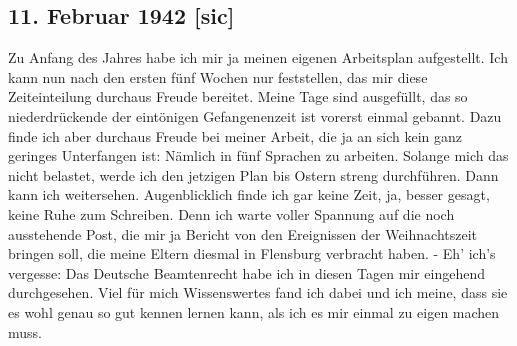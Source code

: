\subsection{11. Februar 1942{\color{red} [sic] }}

Zu Anfang des Jahres habe ich mir ja meinen eigenen Arbeitsplan aufgestellt.
Ich kann nun nach den ersten f\"{u}nf Wochen nur feststellen, das mir diese Zeiteinteilung durchaus Freude bereitet.
Meine Tage sind ausgef\"{u}llt, das so niederdr\"{u}ckende der eint\"{o}nigen Gefangenenzeit ist vorerst einmal gebannt.
Dazu finde ich aber durchaus Freude bei meiner Arbeit, die ja an sich kein ganz geringes Unterfangen ist: N\"{a}mlich in f\"{u}nf Sprachen zu arbeiten.
Solange mich das nicht belastet, werde ich den jetzigen Plan bis Ostern streng durchf\"{u}hren.
Dann kann ich weitersehen.
Augenblicklich finde ich gar keine Zeit, ja, besser gesagt, keine Ruhe zum Schreiben.
Denn ich warte voller Spannung auf die noch ausstehende Post, die mir ja Bericht von den Ereignissen der Weihnachtszeit bringen soll, die meine Eltern diesmal in Flensburg verbracht haben.
- Eh' ich's vergesse: Das Deutsche Beamtenrecht habe ich in diesen Tagen mir eingehend durchgesehen.
Viel f\"{u}r mich Wissenswertes fand ich dabei und ich meine, dass sie es wohl genau so gut kennen lernen kann, als ich es mir einmal zu eigen machen muss.

\clearpage
